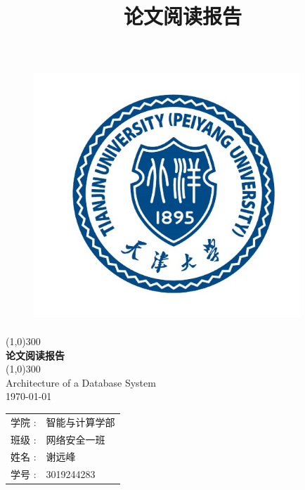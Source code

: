 \documentclass[UTF8,14pt]{article}
\title{论文阅读报告}
\numberwithin{figure}{section}
\begin{document}
\begin{titlepage}
      \begin{center}
            \begin{figure}[ht]
                  \centering
                  \includegraphics[width=10cm,height=9.5cm]{封面.png}
            \end{figure}
            \line(1,0){300}\\
            [0.65cm]
            \Huge{\bfseries 论文阅读报告 }\\
            \line(1,0){300}\\
            \huge {Architecture of a Database System\\
                  \today}\\
            [3.5cm]
            \LARGE{
                  \begin{tabular}{rl}
                        学院 :        & 智能与计算学部 \\
                        班级 :        & 网络安全一班   \\
                        姓名        : & 谢远峰         \\
                        学号       :  & 3019244283
                  \end{tabular}
            }
      \end{center}

\end{titlepage}
\clearpage
\end{document}
